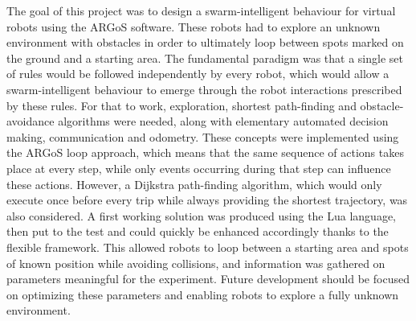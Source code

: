 The goal of this project was to design a swarm-intelligent behaviour for virtual robots using the ARGoS software. These robots had to explore an unknown environment with obstacles in order to ultimately loop between spots marked on the ground and a starting area. The fundamental paradigm was that a single set of rules would be followed independently by every robot, which would allow a swarm-intelligent behaviour to emerge through the robot interactions prescribed by these rules. For that to work, exploration, shortest path-finding and obstacle-avoidance algorithms were needed, along with elementary automated decision making, communication and odometry. These concepts were implemented using the ARGoS loop approach, which means that the same sequence of actions takes place at every step, while only events occurring during that step can influence these actions. However, a Dijkstra path-finding algorithm, which would only execute once before every trip while always providing the shortest trajectory, was also considered. A first working solution was produced using the Lua language, then put to the test and could quickly be enhanced accordingly thanks to the flexible framework. This allowed robots to loop between a starting area and spots of known position while avoiding collisions, and information was gathered on parameters meaningful for the experiment. Future development should be focused on optimizing these parameters and enabling robots to explore a fully unknown environment.